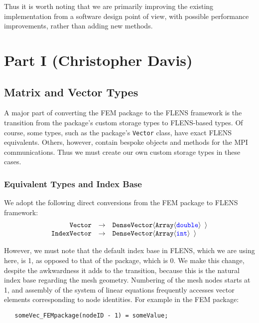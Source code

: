 Thus it is worth noting that we are primarily improving the existing implementation from a software design point of view, with possible performance improvements, rather than adding new methods.

\section{Part I (Christopher Davis)}

\subsection{Matrix and Vector Types}

A major part of converting the FEM package to the FLENS framework is the transition from the package's custom storage types to FLENS-based types. Of course, some types, such as the package's \texttt{Vector} class, have exact FLENS equivalents. Others, however, contain bespoke objects and methods for the MPI communications. Thus we must create our own custom storage types in these cases.

\subsubsection{Equivalent Types and Index Base}

We adopt the following direct conversions from the FEM package to FLENS framework:
\begin{equation*}
\begin{array}{rcl}
   \mbox{\texttt{Vector}}  &  \rightarrow  &  \mbox{\texttt{DenseVector$\langle$Array$\langle${\color{blue}double}$\rangle$ $\rangle$}} \\
   \mbox{\texttt{IndexVector}} & \rightarrow & \mbox{\texttt{DenseVector$\langle$Array$\langle${\color{blue}int}$\rangle$ $\rangle$}}
\end{array}
\end{equation*}

However, we must note that the default index base in FLENS, which we are using here, is 1, as opposed to that of the package, which is 0. We make this change, despite the awkwardness it adds to the transition, because this is the natural index base regarding the mesh geometry. Numbering of the mesh nodes starts at 1, and assembly of the system of linear equations frequently accesses vector elements corresponding to node identities. For example in the FEM package:

\begin{lstlisting}
   someVec_FEMpackage(nodeID - 1) = someValue;
\end{lstlisting}

